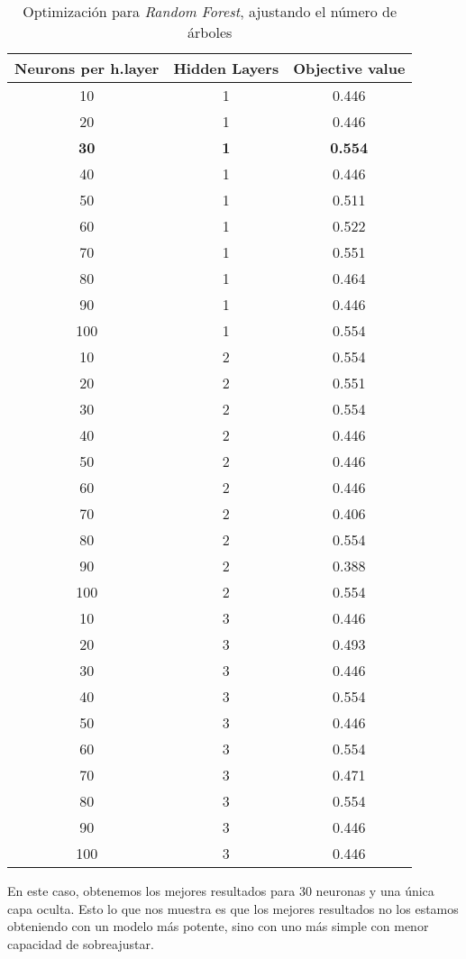 \documentclass[11pt]{article}
\begin{document}
\begin{table}[H]
\begin{center}
    \begin{tabular}{|c|c|c|}
        \hline
        Neurons per h.layer&Hidden Layers&Objective value \\
        \hline
        10&1&0.446 \\
        20&1&0.446 \\
        \textbf{30}&\textbf{1}&\textbf{0.554} \\
        40&1&0.446 \\
        50&1&0.511 \\
        60&1&0.522 \\
        70&1&0.551 \\
        80&1&0.464 \\
        90&1&0.446 \\
        100&1&0.554 \\
        10&2&0.554 \\
        20&2&0.551 \\
        30&2&0.554 \\
        40&2&0.446 \\
        50&2&0.446 \\
        60&2&0.446 \\
        70&2&0.406 \\
        80&2&0.554 \\
        90&2&0.388 \\
        100&2&0.554 \\
        10&3&0.446 \\
        20&3&0.493 \\
        30&3&0.446 \\
        40&3&0.554 \\
        50&3&0.446 \\
        60&3&0.554 \\
        70&3&0.471 \\
        80&3&0.554 \\
        90&3&0.446 \\
        100&3&0.446 \\
        \hline

    \end{tabular}
\end{center}
    \caption{Optimización para \emph{Random Forest}, ajustando el número de árboles}
\end{table}

En este caso, obtenemos los mejores resultados para 30 neuronas y una única capa oculta. Esto lo que nos muestra es que los mejores resultados no los estamos obteniendo con un modelo más potente, sino con uno más simple con menor capacidad de sobreajustar.
\end{document}
